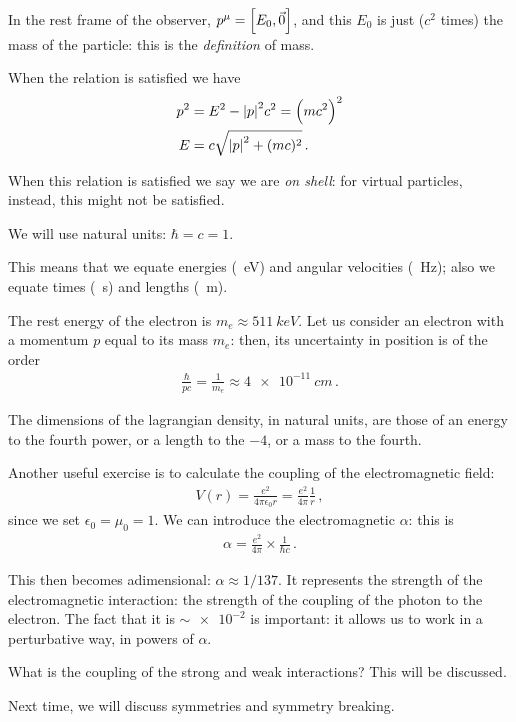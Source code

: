 \documentclass[main.tex]{subfiles}
\begin{document}
In the rest frame of the observer, \(p^{\mu } = \qty[E_{0}, \vec{0}]\), and this \(E_0\) is just (\(c^2\) times)
 the mass of the particle: this is the \emph{definition} of mass. 

When the relation is satisfied we have 
%
\begin{subequations}
\begin{align}
p^2 &= E^2 - \abs{p}^2 c^2= \qty(mc^2)^2  \\
E &= c \sqrt{\abs{p}^2 + (mc)^2}
\,.
\end{align}
\end{subequations}


When this relation is satisfied we say we are \emph{on shell}: for virtual particles, instead, this might not be satisfied.

We will use natural units: \(\hbar = c = 1\). 

This means that we equate energies (\SI{}{eV}) and angular velocities (\SI{}{Hz}); also we equate times (\SI{}{s}) and lengths (\SI{}{m}). 

The rest energy of the electron is \(m_e \approx \SI{511}{keV}\).
Let us consider an electron with a momentum \(p\) equal to its mass \(m_e\): then, its uncertainty in position is of the order 
%
\begin{align}
\frac{\hbar}{p c} = \frac{1}{m_e} \approx \SI{4e-11}{cm}
\,.
\end{align}

The dimensions of the lagrangian density, in natural units, are those of an energy to the fourth power, or a length to the \(-4\), or a mass to the fourth. 

Another useful exercise is to calculate the coupling of the electromagnetic field: 
%
\begin{align}
V(r) = \frac{e^2}{4 \pi \epsilon_{0} r} = \frac{e^2}{4 \pi } \frac{1}{r} 
\,,
\end{align}
%
since we set \(\epsilon_{0} = \mu_0 = 1\). 
We can introduce the electromagnetic \(\alpha \): this is 
%
\begin{align}
\alpha = \frac{e^2}{4 \pi } \times \frac{1}{\hbar c} 
\,.
\end{align}

This then becomes adimensional: \(\alpha \approx 1 / 137\). 
It represents the strength of the electromagnetic interaction: the strength of the coupling of the photon to the electron.  
The fact that it is \(\sim \num{e-2}\) is important: it allows us to work in a perturbative way, in powers of \(\alpha \). 

What is the coupling of the strong and weak interactions? This will be discussed.

Next time, we will discuss symmetries and symmetry breaking. 
\end{document}
